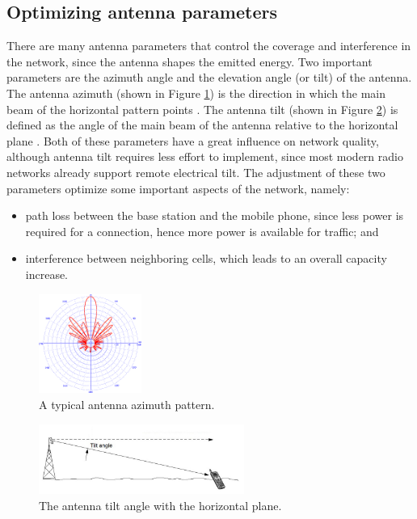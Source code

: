 \subsection{Optimizing antenna parameters}

There are many antenna parameters that control the coverage and interference
in the network, since the antenna shapes the emitted energy. Two important
parameters are the azimuth angle and the elevation angle (or tilt)
of the antenna. The antenna azimuth (shown in Figure \ref{fig:Antenna-azimuth})
is the direction in which the main beam of the horizontal pattern
points \cite{WCDMAforUMTS_RadioAccessForThirdGenerationMobileCommunications}.
The antenna tilt (shown in Figure \ref{fig:Antenna-tilt}) is defined
as the angle of the main beam of the antenna relative to the horizontal
plane \cite{WCDMAforUMTS_RadioAccessForThirdGenerationMobileCommunications}.
Both of these parameters have a great influence on network quality,
although antenna tilt requires less effort to implement, since most
modern radio networks already support remote electrical tilt. The
adjustment of these two parameters optimize some important aspects
of the network, namely:
\begin{itemize}
\item path loss between the base station and the mobile phone, since less
power is required for a connection, hence more power is available
for traffic; and
\item interference between neighboring cells, which leads to an overall
capacity increase.
\end{itemize}
\begin{figure}[h]
\centering

\includegraphics[width=0.3\textwidth]{02-background_and_motivation/img/azimuth}

\caption{A typical antenna azimuth pattern.\label{fig:Antenna-azimuth}}
\end{figure}


\begin{figure}
\centering

\includegraphics[width=0.6\textwidth]{02-background_and_motivation/img/tilt}

\caption{The antenna tilt angle with the horizontal plane.\label{fig:Antenna-tilt}}
\end{figure}



